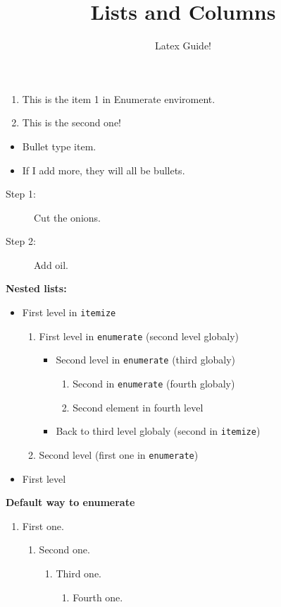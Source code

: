 \documentclass{article}
\author{Latex Guide!}
\title{Lists and Columns}
\date{}
\begin{document}
	\maketitle
	
	\begin{enumerate}
		\item This is the item 1 in Enumerate enviroment.
		\item This is the second one!
	\end{enumerate}

	\begin{itemize}
		\item Bullet type item.
		\item If I add more, they will all be bullets.
	\end{itemize}
	
	\begin{description}
		\item[Step 1:] Cut the onions.
		\item[Step 2:] Add oil.
	\end{description}

\textbf{Nested lists:}

\begin{itemize}
	\item First level in {\tt itemize}
	\begin{enumerate}
		\item First level in {\tt enumerate} (second level globaly)
		\begin{itemize}
			\item Second level in {\tt enumerate}
			(third globaly)
			\begin{enumerate}
				\item Second in {\tt enumerate}
				(fourth globaly)
				\item Second element in fourth level
			\end{enumerate}
			\item Back to third level globaly (second
			in {\tt itemize})
		\end{itemize}
		\item Second level (first one in {\tt enumerate})
	\end{enumerate}
	\item First level
\end{itemize}


\textbf{Default way to enumerate}

\begin{enumerate}
	\item First one.
	\begin{enumerate}
		\item Second one.
		\begin{enumerate}
			\item Third one.
			\begin{enumerate}
				\item Fourth one.
			\end{enumerate}
		\end{enumerate}
	\end{enumerate}
\end{enumerate}
	
\end{document}
